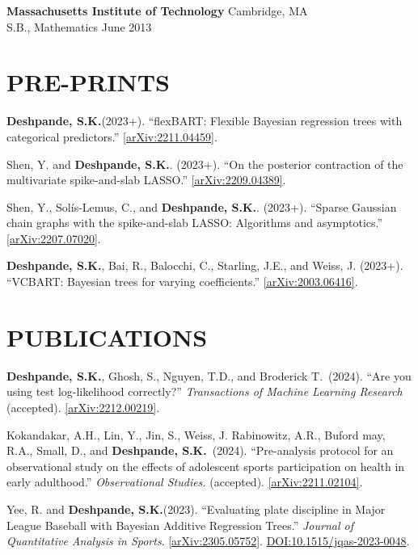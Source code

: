 \documentclass[margin]{res}
\def\skd{\textbf{Deshpande, S.K.}}
\begin{document}
\begin{resume}
                {\bf Massachusetts Institute of Technology} \hfill Cambridge, MA \\
                S.B., Mathematics \hfill June 2013 
  
  
\section{PRE-PRINTS}

\skd (2023+). ``flexBART: Flexible Bayesian regression trees with categorical predictors.'' \href{https://arxiv.org/abs/2211.04459}{[arXiv:2211.04459]}.

Shen, Y. and \skd. (2023+). ``On the posterior contraction of the multivariate spike-and-slab LASSO.'' \href{https://arxiv.org/abs/2209.04389}{[arXiv:2209.04389]}.

Shen, Y., Sol\'{i}s-Lemus, C., and \skd. (2023+). ``Sparse Gaussian chain graphs with the spike-and-slab LASSO: Algorithms and asymptotics.'' \href{https://arxiv.org/abs/2207.07020}{[arXiv:2207.07020]}.

\skd, Bai, R., Balocchi, C., Starling, J.E., and Weiss, J. (2023+). ``VCBART: Bayesian trees for varying coefficients.'' \href{https://arxiv.org/abs/2003.06416}{[arXiv:2003.06416]}. %

\section{PUBLICATIONS}

\skd, Ghosh, S., Nguyen, T.D., and Broderick T.~(2024). ``Are you using test log-likelihood correctly?'' \textit{Transactions of Machine Learning Research} (accepted). \href{https://arxiv.org/abs/2212.00219}{[arXiv:2212.00219]}.

Kokandakar, A.H., Lin, Y., Jin, S., Weiss, J. Rabinowitz, A.R., Buford may, R.A., Small, D., and \skd~(2024). ``Pre-analysis protocol for an observational study on the effects of adolescent sports participation on health in early adulthood.'' \textit{Observational Studies.} (accepted). \href{https://arxiv.org/abs/2211.02104}{[arXiv:2211.02104]}.

Yee, R. and \skd (2023). ``Evaluating plate discipline in Major League Baseball with Bayesian Additive Regression Trees.'' \textit{Journal of Quantitative Analysis in Sports}. \href{https://arxiv.org/abs/2305.05752}{[arXiv:2305.05752]}. \href{https://doi.org/10.1515/jqas-2023-0048}{DOI:10.1515/jqas-2023-0048}.


\end{resume}
\end{document}
